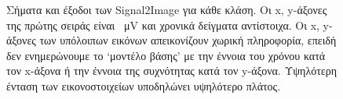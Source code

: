 \begin{figure}
	\quad
	\quad
	\quad
	\quad
	\caption[Σήματα και έξοδοι των Signal2Image για κάθε κλάση]{Σήματα και έξοδοι των Signal2Image για κάθε κλάση.
	Οι x, y-άξονες της πρώτης σειράς είναι \SI{}{\micro V} και χρονικά δείγματα αντίστοιχα.
	Οι x, y-άξονες των υπόλοιπων εικόνων απεικονίζουν χωρική πληροφορία, επειδή δεν ενημερώνουμε το `μοντέλο βάσης' με την έννοια του χρόνου κατά τον x-άξονα ή την έννοια της συχνότητας κατά τον y-άξονα.
	Υψηλότερη ένταση των εικονοστοιχείων υποδηλώνει υψηλότερο πλάτος.}
	\label{fig:signal2imageoutputs}
\end{figure}

